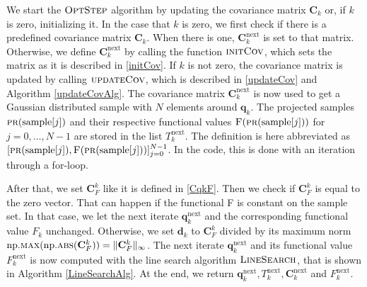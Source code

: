 We start the $\textproc{OptStep}$ algorithm by updating the covariance matrix $\mathbf{C}_k$ or, if $k$ is zero, initializing it. In the case that $k$ is zero, we first check if there is a predefined covariance matrix $\mathbf{C}_k$. When there is one, $\mathbf{C}^\mathrm{next}_k$ is set to that matrix. Otherwise, we define $\mathbf{C}^\mathrm{next}_k$ by calling the function $\textproc{initCov}$, which sets the matrix as it is described in \eqref{initCov}. If $k$ is not zero, the covariance matrix is updated by calling $\textproc{updateCov}$, which is described in \eqref{updateCov} and Algorithm \ref{updateCovAlg}. The covariance matrix $\mathbf{C}^\mathrm{next}_k$ is now used to get a Gaussian distributed sample with $N$ elements around $\mathbf{q}_k$. The projected samples $\Call{pr}{\mathrm{sample}[j]}$ and their respective functional values $\Call{F}{\protect\Call{pr}{\mathrm{sample}[j]}}$ for $j=0,\dotsc,N-1$ are stored in the list $T^\mathrm{next}_k$. The definition is here abbreviated as $[\Call{pr}{\mathrm{sample}[j]},\Call{F}{\protect\Call{pr}{\mathrm{sample}[j]}}]_{j=0}^{N-1}$. In the code, this is done with an iteration through a for-loop.

After that, we set $\mathbf{C}^k_F$ like it is defined in \eqref{CqkF}. Then we check if $\mathbf{C}^k_F$ is equal to the zero vector. That can happen if the functional F is constant on the sample set. In that case, we let the next iterate $\mathbf{q}^\mathrm{next}_k$ and the corresponding functional value $F_k$ unchanged. Otherwise, we set $\mathbf{d}_k$ to $\mathbf{C}^k_F$ divided by its maximum norm $\mathrm{np.}\Call{max}{\mathrm{np.}\protect\Call{abs}{\mathbf{C}^k_F}}=\|\mathbf{C}^k_F\|_\infty$. The next iterate $\mathbf{q}^\mathrm{next}_{k}$ and its functional value $F^\mathrm{next}_k$ is now computed with the line search algorithm $\textproc{LineSearch}$, that is shown in Algorithm \ref{LineSearchAlg}. At the end, we return $\mathbf{q}^\mathrm{next}_k,T^\mathrm{next}_k,\mathbf{C}^\mathrm{next}_k$ and $F^\mathrm{next}_k$.


